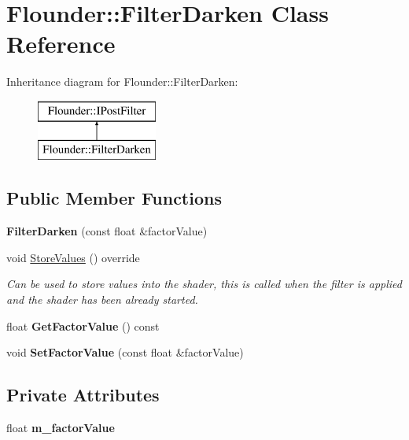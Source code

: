 \hypertarget{class_flounder_1_1_filter_darken}{}\section{Flounder\+:\+:Filter\+Darken Class Reference}
\label{class_flounder_1_1_filter_darken}
Inheritance diagram for Flounder\+:\+:Filter\+Darken\+:\begin{figure}[H]
\begin{center}
\leavevmode
\includegraphics[height=2.000000cm]{class_flounder_1_1_filter_darken}
\end{center}
\end{figure}
\subsection*{Public Member Functions}
\begin{DoxyCompactItemize}
\item 
\mbox{\label{class_flounder_1_1_filter_darken_ac3efe075718dd79e04c1cdd223f10ce0}} 
{\bfseries Filter\+Darken} (const float \&factor\+Value)
\item 
void \hyperlink{class_flounder_1_1_filter_darken_a6c9ef0c04873788ddbd4b4a458598377}{Store\+Values} () override
\begin{DoxyCompactList}\small\item\em Can be used to store values into the shader, this is called when the filter is applied and the shader has been already started. \end{DoxyCompactList}\item 
\mbox{\label{class_flounder_1_1_filter_darken_ac42f672d4e7535c07de1e72f38b323ec}} 
float {\bfseries Get\+Factor\+Value} () const
\item 
\mbox{\label{class_flounder_1_1_filter_darken_a9eb6e390b43238a598cab2daaf537f90}} 
void {\bfseries Set\+Factor\+Value} (const float \&factor\+Value)
\end{DoxyCompactItemize}
\subsection*{Private Attributes}
\begin{DoxyCompactItemize}
\item 
\mbox{\label{class_flounder_1_1_filter_darken_a2d333cbbaa104c31a80e7d80771fa35f}} 
float {\bfseries m\+\_\+factor\+Value}
\end{DoxyCompactItemize}
